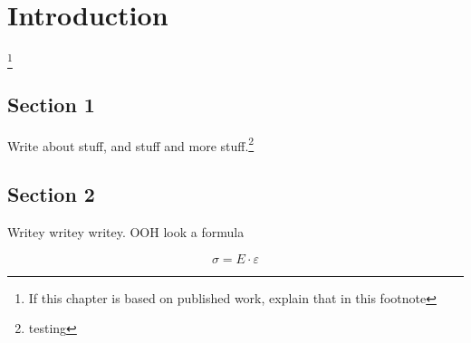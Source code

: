 
\chapter{Introduction}

\footnote{If this chapter is based on published work, explain that in this footnote}\label{chap:intro}


\begin{refsection}


\newpage	
\section{Section 1}

Write about stuff, and stuff and more stuff.\footnote{testing}

\section{Section 2}

Writey writey writey. OOH look a formula \footnotemark
{}

\begin{equation} \label{eq:Youngs}
\sigma = E \cdot \varepsilon
\end{equation}

\printbibliography[title={Bibliography}]
\end{refsection}
